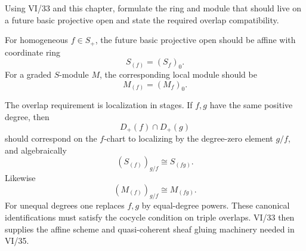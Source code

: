 \begin{problem}\label{prob:vi34-12}
Using VI/33 and this chapter, formulate the ring and module that should live on a future basic projective open and state the required overlap compatibility.
\end{problem}

\ifdefined\FullProblemDossiers
\begin{solution}
For homogeneous \(f\in S_+\), the future basic projective open should be affine with coordinate ring
\[
\boxed{S_{(f)}=(S_f)_0}.
\]
For a graded \(S\)-module \(M\), the corresponding local module should be
\[
\boxed{M_{(f)}=(M_f)_0}.
\]

The overlap requirement is localization in stages. If \(f,g\) have the same positive degree, then
\[
D_+(f)\cap D_+(g)
\]
should correspond on the \(f\)-chart to localizing by the degree-zero element \(g/f\), and algebraically
\[
(S_{(f)})_{g/f}\cong S_{(fg)}.
\]
Likewise
\[
(M_{(f)})_{g/f}\cong M_{(fg)}.
\]
For unequal degrees one replaces \(f,g\) by equal-degree powers. These canonical identifications must satisfy the
cocycle condition on triple overlaps. VI/33 then supplies the affine scheme and quasi-coherent sheaf gluing
machinery needed in VI/35.
\end{solution}
\fi
